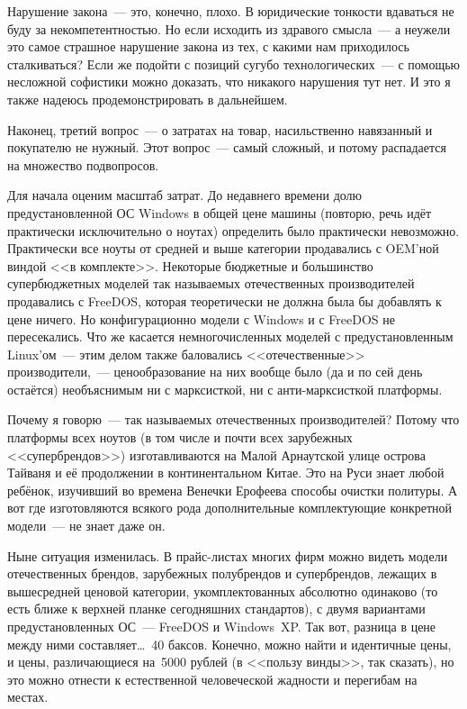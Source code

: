 Нарушение закона~--- это, конечно, плохо. В юридические тонкости вдаваться не буду за некомпетентностью. Но если исходить из здравого смысла~--- а неужели это самое страшное нарушение закона из тех, с какими нам приходилось сталкиваться? Если же подойти с позиций сугубо технологических~--- с помощью несложной софистики можно доказать, что никакого нарушения тут нет. И это я также надеюсь продемонстрировать в дальнейшем.

Наконец, третий вопрос~--- о затратах на товар, насильственно навязанный и покупателю не нужный. Этот вопрос~--- самый сложный, и потому распадается на множество подвопросов.

Для начала оценим масштаб затрат. До недавнего времени долю предустановленной ОС Windows в общей цене машины (повторю, речь идёт практически исключительно о ноутах) определить было практически невозможно. Практически все ноуты от средней и выше категории продавались с OEM'ной виндой <<в комплекте>>. Некоторые бюджетные и большинство супербюджетных моделей так называемых отечественных производителей продавались с FreeDOS, которая теоретически не должна была бы добавлять к цене ничего. Но конфигурационно модели с Windows и с FreeDOS не пересекались. Что же касается немногочисленных моделей с предустановленным Linux'ом~--- этим делом также баловались <<отечественные>> производители,~--- ценообразование на них вообще было (да и по сей день остаётся) необъяснимым ни с марксисткой, ни с анти-марксисткой платформы.

Почему я говорю~--- так называемых отечественных производителей? Потому что платформы всех ноутов (в том числе и почти всех зарубежных <<супербрендов>>) изготавливаются на Малой Арнаутской улице острова Тайваня и её продолжении в континентальном Китае. Это на Руси знает любой ребёнок, изучивший во времена Венечки Ерофеева способы очистки политуры. А вот где изготовляются всякого рода дополнительные комплектующие конкретной модели~--- не знает даже он.

Ныне ситуация изменилась. В прайс-листах многих фирм можно видеть модели отечественных брендов, зарубежных полубрендов и супербрендов, лежащих в вышесредней ценовой категории, укомплектованных абсолютно одинаково (то есть ближе к верхней планке сегодняшних стандартов), с двумя вариантами предустановленных ОС~--- FreeDOS и Windows~XP. Так вот, разница в цене между ними составляет\dots~40 баксов. Конечно, можно найти и идентичные цены, и цены, различающиеся на~5000 рублей (в <<пользу винды>>, так сказать), но это можно отнести к естественной человеческой жадности и перегибам на местах.

